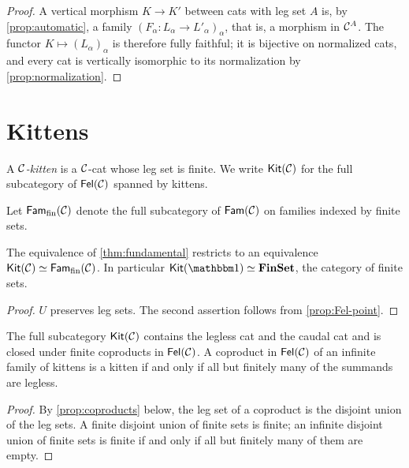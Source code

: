 \begin{proof}
A vertical morphism $K\to K'$ between cats with leg set $A$ is, by
\cref{prop:automatic}, a family $(F_\alpha\colon L_\alpha\to L'_\alpha)_\alpha$,
that is, a morphism in $\mathcal{C}^A$. The functor $K\mapsto(L_\alpha)_\alpha$ is
therefore fully faithful; it is bijective on normalized cats, and every cat
is vertically isomorphic to its normalization by \cref{prop:normalization}.
\end{proof}

\section{Kittens}\label{sec:kittens}

\begin{definition}\label{def:kitten}
A \emph{$\mathcal{C}$-kitten} is a $\mathcal{C}$-cat whose leg set is finite. We write
$\mathsf{Kit}(\mathcal{C})$ for the full subcategory of $\mathsf{Fel}(\mathcal{C})$ spanned by kittens.
\end{definition}

Let $\mathsf{Fam}_{\mathrm{fin}}(\mathcal{C})$ denote the full subcategory of $\mathsf{Fam}(\mathcal{C})$ on
families indexed by finite sets.

\begin{proposition}\label{prop:kit-fam}
The equivalence of \cref{thm:fundamental} restricts to an equivalence
$\mathsf{Kit}(\mathcal{C})\simeq\mathsf{Fam}_{\mathrm{fin}}(\mathcal{C})$. In particular $\Kit(\one)\eqv\mathbf{FinSet}$,
the category of finite sets.
\end{proposition}

\begin{proof}
$U$ preserves leg sets. The second assertion follows from
\cref{prop:Fel-point}.
\end{proof}

\begin{proposition}\label{prop:kit-coproducts}
The full subcategory $\mathsf{Kit}(\mathcal{C})$ contains the legless cat and the caudal cat
and is closed under finite coproducts in $\mathsf{Fel}(\mathcal{C})$. A coproduct in
$\mathsf{Fel}(\mathcal{C})$ of an infinite family of kittens is a kitten if and only if all but
finitely many of the summands are legless.
\end{proposition}

\begin{proof}
By \cref{prop:coproducts} below, the leg set of a coproduct is the disjoint
union of the leg sets. A finite disjoint union of finite sets is finite; an
infinite disjoint union of finite sets is finite if and only if all but
finitely many of them are empty.
\end{proof}


